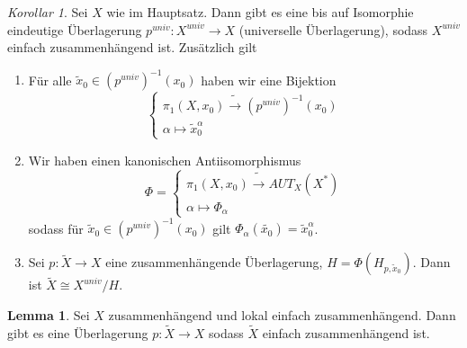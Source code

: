 \documentclass[a4paper, 12pt]{article}
\theoremstyle{plain}
\theoremstyle{definition}
\theoremstyle{lemma}
\newtheorem{lemma}[theorem]{Lemma}
\theoremstyle{remark}
\theoremstyle{corollary}
\newtheorem{corollary}[theorem]{Korollar}
\theoremstyle{example}
\begin{document}
	\begin{corollary}
		Sei $X$ wie im Hauptsatz. Dann gibt es eine bis auf Isomorphie eindeutige Überlagerung $p^{univ}:X^{univ} \to X$ (universelle Überlagerung), sodass $X^{univ}$ einfach zusammenhängend ist. Zusätzlich gilt \begin{enumerate}
			\item Für alle $\tilde{x}_0 \in (p^{univ})^{-1}(x_0)$ haben wir eine Bijektion \[\begin{cases}
				\pi_1(X,x_0) \tilde{\rightarrow} (p^{univ})^{-1}(x_0)\\
				\alpha \mapsto \tilde{x}_0^\alpha
			\end{cases}\]
		\item Wir haben einen kanonischen Antiisomorphismus \[\Phi = \begin{cases}
			\pi_1(X,x_0) \tilde{\rightarrow} AUT_X(X^*)\\
			\alpha \mapsto \Phi_\alpha
		\end{cases}\]
		sodass für $\tilde{x}_0 \in (p^{univ})^{-1}(x_0)$ gilt $\Phi_\alpha(\tilde{x_0}) = \tilde{x}_0^\alpha$.
		\item Sei $p:\tilde{X} \to X$ eine zusammenhängende Überlagerung, $H = \Phi(H_{p,\tilde{x}_0})$. Dann ist $\tilde{X} \cong X^{univ} / H$.
		\end{enumerate}
	\end{corollary}
	\begin{lemma}
		Sei $X$ zusammenhängend und lokal einfach zusammenhängend. Dann gibt es eine Überlagerung $p: \tilde{X} \to X$ sodass $\tilde{X}$ einfach zusammenhängend ist.
	\end{lemma}
\end{document}
